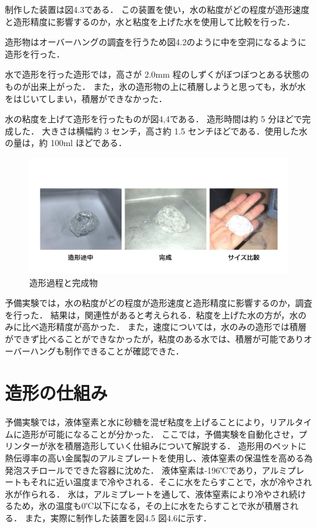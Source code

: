 制作した装置は図4.3である．
この装置を使い，水の粘度がどの程度が造形速度と造形精度に影響するのか，水と粘度を上げた水を使用して比較を行った．

造形物はオーバーハングの調査を行うため図4.2のように中を空洞になるように造形を行った． 

水で造形を行った造形では，高さが 2.0mm  程のしずくがぼつぼつとある状態のものが出来上がった．
また，氷の造形物の上に積層しようと思っても，氷が水をはじいてしまい，積層ができなかった．

水の粘度を上げて造形を行ったものが図4,4である．
造形時間は約 5 分ほどで完成した．
大きさは横幅約 3 センチ，高さ約 1.5 センチほどである．使用した水の量は，約 100ml ほどである．

\begin{figure}[H]
  \centering
  \includegraphics[width=15truecm]{./fig/yobi.jpg}
  \caption{造形過程と完成物}
  \label{fig:yobikekka}
\end{figure}

予備実験では，水の粘度がどの程度が造形速度と造形精度に影響するのか，調査を行った．
結果は，関連性があると考えられる．粘度を上げた水の方が，水のみに比べ造形精度が高かった．
また，速度については，水のみの造形では積層ができず比べることができなかったが，粘度のある水では、積層が可能でありオーバーハングも制作できることが確認できた．

\section{造形の仕組み}
\label{sec:paragraph}
予備実験では，液体窒素と水に砂糖を混ぜ粘度を上げることにより，リアルタイムに造形が可能になることが分かった．
ここでは，予備実験を自動化させ，プリンターが氷を積層造形していく仕組みについて解説する．
造形用のペットに熱伝導率の高い金属製のアルミプレートを使用し、液体窒素の保温性を高める為発泡スチロールでできた容器に沈めた．
液体窒素は-196℃であり，アルミプレートもそれに近い温度まで冷やされる．そこに水をたらすことで，水が冷やされ氷が作られる．
氷は，アルミプレートを通して、液体窒素により冷やされ続けるため，氷の温度も0℃以下になる，その上に水をたらすことで氷が積層される．
また，実際に制作した装置を図4.5 図4.6に示す．


